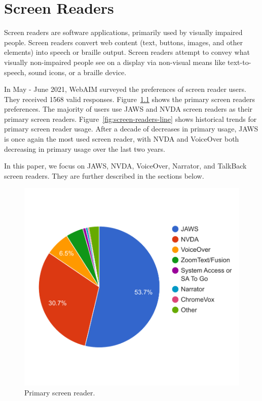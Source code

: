 %
%
% 
% 
% 


\chapter{Screen Readers}

Screen readers are software applications, primarily used by visually impaired people. Screen readers convert web content (text, buttons, images, and other elements) into speech or braille output. Screen readers attempt to convey what visually non-impaired people see on a display via non-visual means like text-to-speech, sound icons, or a braille device.

In May - June 2021, WebAIM surveyed the  preferences of screen reader users. They received 1568 valid responses. Figure~\ref{fig:screen-readers-piechart} shows the primary screen readers preferences. The majority of users use JAWS and NVDA screen readers as their primary screen readers. Figure~\ref{fig:screen-readers-line} shows historical trends for primary screen reader usage. After a decade of decreases in primary usage, JAWS is once again the most used screen reader, with NVDA and VoiceOver both decreasing in primary usage over the last two years.

In this paper, we focus on JAWS, NVDA, VoiceOver, Narrator, and TalkBack screen readers. They are further described in the sections below.

\begin{figure}[tp]
\centering
\includegraphics[keepaspectratio,width=\linewidth,height=\halfh]
{images/screen-readers-piechart.pdf}

\caption[Primary Screen Reader]{
Primary screen reader.
}
\label{fig:screen-readers-piechart}
\end{figure}

